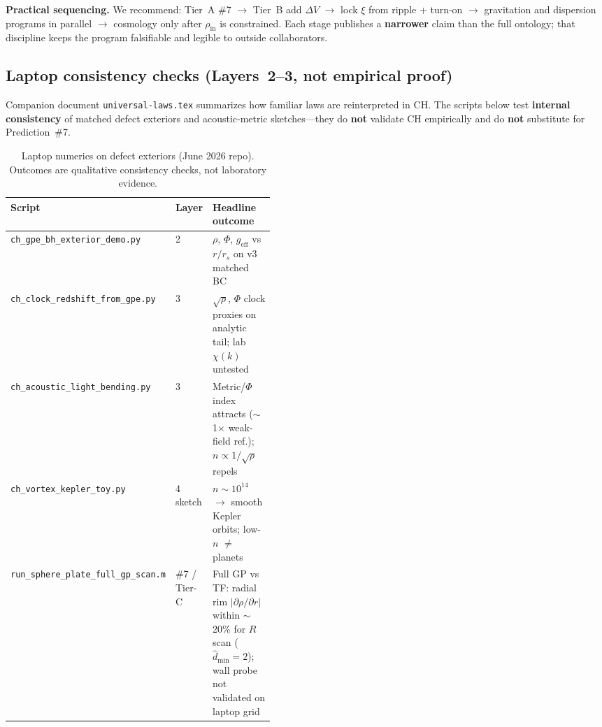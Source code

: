 \documentclass[11pt,a4paper]{article}
\begin{document}
\textbf{Practical sequencing.}
We recommend: Tier~A \#7 $\to$ Tier~B add $\Delta V$ $\to$ lock $\xi$ from ripple + turn-on $\to$ gravitation and dispersion programs in parallel $\to$ cosmology only after $\rho_{\mathrm{in}}$ is constrained.
Each stage publishes a \textbf{narrower} claim than the full ontology; that discipline keeps the program falsifiable and legible to outside collaborators.

\subsection{Laptop consistency checks (Layers~2--3, not empirical proof)}
\label{sec:numerics-consistency}

Companion document \texttt{universal-laws.tex} summarizes how familiar laws are reinterpreted in CH.
The scripts below test \textbf{internal consistency} of matched defect exteriors and acoustic-metric sketches---they do \textbf{not} validate CH empirically and do \textbf{not} substitute for Prediction~\#7.

\begin{table}[htbp]
  \centering
  \footnotesize
  \caption{Laptop numerics on defect exteriors (June 2026 repo). Outcomes are qualitative consistency checks, not laboratory evidence.}
  \label{tab:numerics-consistency}
  \begin{tabular}{@{}llp{0.44\linewidth}@{}}
    \toprule
    Script & Layer & Headline outcome \\
    \midrule
    \texttt{ch\_gpe\_bh\_exterior\_demo.py} & 2 & $\rho$, $\Phi$, $g_{\mathrm{eff}}$ vs $r/r_s$ on v3 matched BC \\
    \texttt{ch\_clock\_redshift\_from\_gpe.py} & 3 & $\sqrt{\rho}$, $\Phi$ clock proxies on analytic tail; lab $\chi(k)$ untested \\
    \texttt{ch\_acoustic\_light\_bending.py} & 3 & Metric/$\Phi$ index attracts ($\sim$1$\times$ weak-field ref.); $n \propto 1/\sqrt{\rho}$ repels \\
    \texttt{ch\_vortex\_kepler\_toy.py} & 4 sketch & $n \sim 10^{14}$ $\to$ smooth Kepler orbits; low-$n$ $\neq$ planets \\
    \texttt{run\_sphere\_plate\_full\_gp\_scan.m} & \#7 / Tier-C & Full GP vs TF: radial rim $|\partial\rho/\partial r|$ within $\sim$20\% for $R$ scan ($\hat{d}_{\min}=2$); wall probe not validated on laptop grid \\
    \bottomrule
  \end{tabular}
\end{table}
\end{document}
